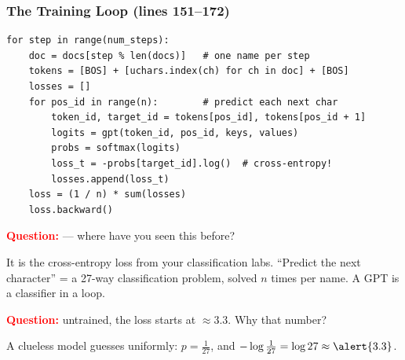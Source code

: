 \begin{frame}[fragile]
    \frametitle{The Training Loop (lines 151--172)}

\begin{lstlisting}
for step in range(num_steps):
    doc = docs[step % len(docs)]   # one name per step
    tokens = [BOS] + [uchars.index(ch) for ch in doc] + [BOS]
    losses = []
    for pos_id in range(n):        # predict each next char
        token_id, target_id = tokens[pos_id], tokens[pos_id + 1]
        logits = gpt(token_id, pos_id, keys, values)
        probs = softmax(logits)
        loss_t = -probs[target_id].log()  # cross-entropy!
        losses.append(loss_t)
    loss = (1 / n) * sum(losses)
    loss.backward()
\end{lstlisting}

    \pause

    \textcolor{red}{\textbf{Question:}}  --- where have you seen this before?

    \pause

    It \alert{is} the cross-entropy loss from your classification labs. ``Predict the next character'' = a \alert{27-way classification problem}, solved $n$ times per name. A GPT is a classifier in a loop.

    \pause

    \textcolor{red}{\textbf{Question:}} untrained, the loss starts at $\approx 3.3$. Why that number?

    \pause

    A clueless model guesses uniformly: $p = \frac{1}{27}$, and $-\log\frac{1}{27} = \log 27 \approx \alert{3.3}$.
\end{frame}

